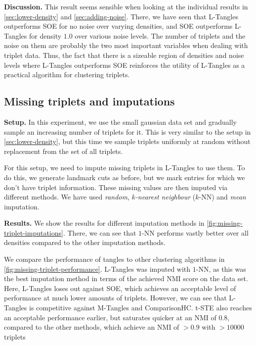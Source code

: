 \noindent
\textbf{Discussion.}
This result seems sensible when looking at the individual results in \autoref{sec:lower-density} and \autoref{sec:adding-noise}. There, we have seen that L-Tangles
outperforms SOE for no noise over varying densities, and SOE outperforms L-Tangles for density $1.0$ over various noise levels. The number of triplets and the noise on them are probably
the two most important variables when dealing with triplet data. Thus, the fact that there is a sizeable region of densities and noise levels where L-Tangles outperforms
SOE reinforces the utility of L-Tangles as a practical algorithm for clustering triplets.

\subsection{Missing triplets and imputations}\label{sec:imputation}
\textbf{Setup.}
In this experiment, we use the small gaussian data set and gradually sample an increasing number of triplets for it. 
This is very similar to the setup in \autoref{sec:lower-density}, but this time we sample triplets uniformly at random without replacement
from the set of all triplets. 

For this setup, we need to impute missing triplets in L-Tangles to use them. To do this, we generate landmark cuts as before,
but we mark entries for which we don't have triplet information. These missing values are then imputed via different methods.
We have used \textit{random}, \textit{$k$-nearest neighbour }($k$-NN) and \textit{mean} imputation. 

\noindent
\textbf{Results.}
We show the results for different imputation methods in \autoref{fig:missing-triplet-imputations}. 
There, we can see that $1$-NN performs vastly better over all densities compared to the other imputation methods.

We compare the performance of tangles to other clustering algorithms in \autoref{fig:missing-triplet-performance}. L-Tangles was imputed with $1$-NN, as this
was the best imputation method in terms of the achieved NMI score on the data set. 
Here, L-Tangles loses out against SOE, which achieves an acceptable level of performance at much lower amounts of triplets. 
However, we can see that L-Tangles is competitive against M-Tangles and ComparisonHC. t-STE also reaches an acceptable performance earlier, but saturates quicker at an NMI of $0.8$, compared to the other methods, which achieve an NMI of $>0.9$ with $>10000$ triplets


